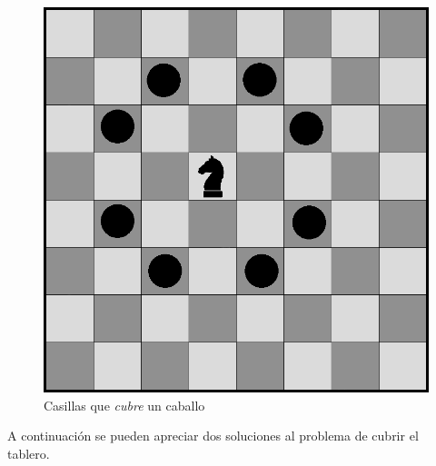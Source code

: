 \documentclass[a4paper]{article}
\begin{document}
 \begin{figure}[h!]
   \begin{center}
 	\includegraphics[scale=0.3]{imagenes/ej3/caballito.png}
 	\caption{Casillas que \emph{cubre} un caballo}
 	\label{caballito}	
   \end{center}
 \end{figure}


A continuaci\'on se pueden apreciar dos soluciones al problema de cubrir el tablero.
\end{document}
